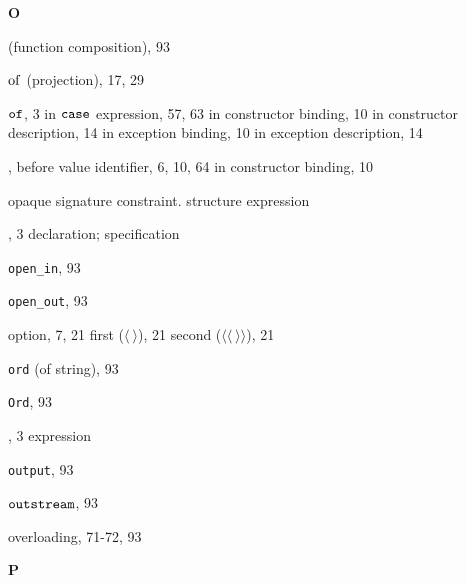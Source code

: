\begin{theindex}
\parbox{65mm}{\hfil{\large\bf O}\hfil}

\indexspace

\item {} (function composition), 93
\item $\mathbin{\rm of}$ (projection), 17, 29
\item ${\tt of}$, 3
\subitem in ${\tt case}$ expression, 57, 63
\subitem in constructor binding, 10
\subitem in constructor description, 14
\subitem in exception binding, 10
\subitem in exception description, 14
\item \OP,
\subitem before value identifier, 6, 10, 64
\subitem in constructor binding, 10
\item opaque signature constraint. \see structure expression
\item \OPEN, 3 
\subitem \seealso declaration; specification
\item \verb+open_in+, 93
\item \verb+open_out+, 93
\item option, 7, 21
\subitem first ($\langle\ \rangle$), 21
\subitem second ($\langle\langle\ \rangle\rangle$), 21
\item {\tt ord} (of string), 93
\item {\tt Ord}, 93
\item \ORELSE, 3
\subitem \seealso expression
\item {\tt output}, 93
\item $\mbox{\tt outstream}$, 93
\item overloading, 71-72, 93
\indexspace

\parbox{65mm}{\hfil{\large\bf P}\hfil}

\indexspace


\end{theindex}
